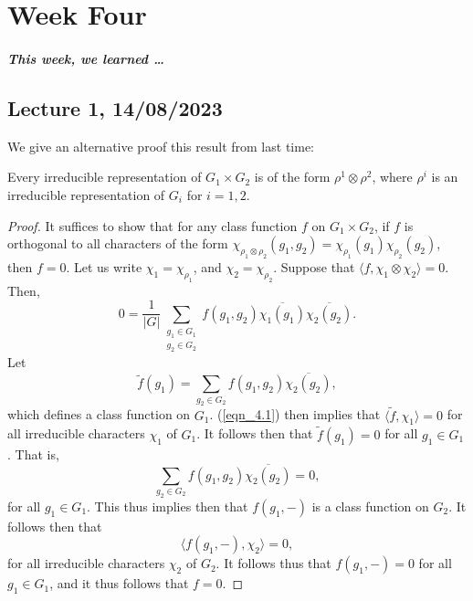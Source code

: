 \documentclass[a4paper]{report}
\theoremstyle{definition}
\theoremstyle{remark}
\theoremstyle{proposition}
\theoremstyle{conjecture}
\theoremstyle{lemma}
\theoremstyle{corollary}
\theoremstyle{exercise}
\theoremstyle{example}
\begin{document}
\chapter{Week Four}

\paragraph{This week, we learned \ldots}

\section{Lecture 1, 14/08/2023}

We give an alternative proof this result from last time:
\begin{theorem}
    Every irreducible representation of $G_1\times G_2$ is of the form 
    $\rho^1\otimes \rho^2$, where $\rho^i$ is an irreducible representation
    of $G_i$ for $i=1,2$.
\end{theorem}

\begin{proof}
    It suffices to show that for any class function $f$ on $G_1\times G_2$, 
    if $f$ is orthogonal to all characters of the form 
    $\chi_{\rho_1\otimes\rho_2}(g_1,g_2)=\chi_{\rho_1}(g_1)\chi_{\rho_2}(g_2)$,
    then $f=0$. Let us write $\chi_1 = \chi_{\rho_1}$, and 
    $\chi_2= \chi_{\rho_2}$. Suppose that 
    $\langle f,\chi_1\otimes\chi_2\rangle = 0$. Then, 
    \begin{equation}\label{eqn_4.1}
        0=\frac{1}{\vert G\vert} \sum_{\substack{g_1 \in G_1\\ g_2 \in G_2}} f(g_1,g_2) \overline{\chi_1(g_1)}\overline{\chi_2(g_2)}.
    \end{equation}
    Let $$\widetilde{f}(g_1) = \sum_{g_2 \in G_2} f(g_1,g_2) \overline{\chi_2(g_2)},$$
    which defines a class function on $G_1$. (\ref{eqn_4.1}) then implies that 
    $\langle\widetilde{f},\chi_1\rangle = 0$ for all irreducible characters
    $\chi_1$ of $G_1$. It follows then that $\widetilde{f}(g_1) = 0$ for all 
    $g_1 \in G_1$.
    That is, $$\sum_{g_2 \in G_2}f(g_1,g_2) \overline{\chi_2(g_2)}= 0,$$
    for all $g_1\in G_1$. This thus implies then that 
    $f(g_1,-)$ is a class function on $G_2$. 
    It follows then that 
    $$\langle f(g_1,-),\chi_2\rangle = 0,$$
    for all irreducible characters $\chi_2$ of $G_2$. It follows thus
    that $f(g_1,-) = 0$ for all $g_1\in G_1$, and it thus follows
    that $f=0$.
\end{proof}
\end{document}

